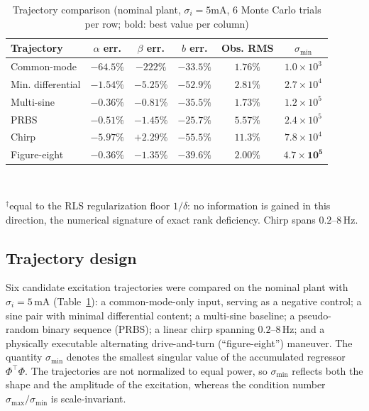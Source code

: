 \documentclass[letterpaper, 10 pt, conference]{ieeeconf}
\begin{document}
\begin{table}[t]
\centering
\caption{Trajectory comparison (nominal plant, $\sigma_i=5$mA, 6 Monte Carlo trials per row; bold: best value per column)}
\label{tab:traj}
\scriptsize
\setlength{\tabcolsep}{2.8pt}
\begin{tabular}{lccccc}
\hline
Trajectory & $\alpha$ err. & $\beta$ err. & $b$ err. & Obs. RMS & $\sigma_{\min}$ \\
\hline
Common-mode & $-64.5\%$ & $-222\%$ & $-33.5\%$ & $1.76\%$ & $1.0{\times}10^3$\rlap{$^\dagger$} \\
Min. differential & $-1.54\%$ & $-5.25\%$ & $-52.9\%$ & $2.81\%$ & $2.7{\times}10^4$ \\
Multi-sine & $\mathbf{-0.36\%}$ & $\mathbf{-0.81\%}$ & $-35.5\%$ & $\mathbf{1.73\%}$ & $1.2{\times}10^5$ \\
PRBS & $-0.51\%$ & $-1.45\%$ & $\mathbf{-25.7\%}$ & $5.57\%$ & $2.4{\times}10^5$ \\
Chirp & $-5.97\%$ & $+2.29\%$ & $-55.5\%$ & $11.3\%$ & $7.8{\times}10^4$ \\
Figure-eight & $\mathbf{-0.36\%}$ & $-1.35\%$ & $-39.6\%$ & $2.00\%$ & $\mathbf{4.7{\times}10^5}$ \\
\hline
\end{tabular}
\\ \raggedright \footnotesize $^\dagger$equal to the RLS regularization floor $1/\delta$: no information is gained in this direction, the numerical signature of exact rank deficiency. Chirp spans $0.2$--$8$\,Hz.
\end{table}

\subsection{Trajectory design}
\label{sec:trajexp}
Six candidate excitation trajectories were compared on the nominal plant with $\sigma_i=5$\,mA (Table~\ref{tab:traj}): a common-mode-only input, serving as a negative control; a sine pair with minimal differential content; a multi-sine baseline; a pseudo-random binary sequence (PRBS); a linear chirp spanning $0.2$--$8$\,Hz; and a physically executable alternating drive-and-turn (``figure-eight'') maneuver. The quantity $\sigma_{\min}$ denotes the smallest singular value of the accumulated regressor $\Phi^\top\Phi$. The trajectories are not normalized to equal power, so $\sigma_{\min}$ reflects both the shape and the amplitude of the excitation, whereas the condition number $\sigma_{\max}/\sigma_{\min}$ is scale-invariant.
\end{document}

